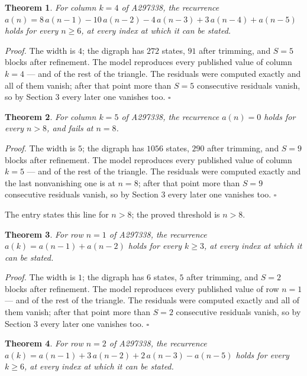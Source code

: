 \documentclass[11pt]{article}
\newtheorem{theorem}{Theorem}
\theoremstyle{definition}
\begin{document}
\begin{theorem} For column $k = 4$ of A297338, the recurrence $a(n) = 8\,a(n-1) - 10\,a(n-2) - 4\,a(n-3) + 3\,a(n-4) + a(n-5)$ holds for every $n \ge 6$, at every index at which it can be stated.\end{theorem}

{\itshape Proof.} The width is $4$; the digraph has $272$ states, $91$ after trimming, and $S = 5$ blocks after refinement. The model reproduces every published value of column $k = 4$ --- and of the rest of the triangle. The residuals were computed exactly and all of them vanish; after that point more than $S = 5$ consecutive residuals vanish, so by Section 3 every later one vanishes too. $\square$

\begin{theorem} For column $k = 5$ of A297338, the recurrence $a(n) = 0$ holds for every $n > 8$, and fails at $n = 8$.\end{theorem}

{\itshape Proof.} The width is $5$; the digraph has $1056$ states, $290$ after trimming, and $S = 9$ blocks after refinement. The model reproduces every published value of column $k = 5$ --- and of the rest of the triangle. The residuals were computed exactly and the last nonvanishing one is at $n = 8$; after that point more than $S = 9$ consecutive residuals vanish, so by Section 3 every later one vanishes too. $\square$

The entry states this line for $n > 8$; the proved threshold is $n > 8$.

\begin{theorem} For row $n = 1$ of A297338, the recurrence $a(k) = a(n-1) + a(n-2)$ holds for every $k \ge 3$, at every index at which it can be stated.\end{theorem}

{\itshape Proof.} The width is $1$; the digraph has $6$ states, $5$ after trimming, and $S = 2$ blocks after refinement. The model reproduces every published value of row $n = 1$ --- and of the rest of the triangle. The residuals were computed exactly and all of them vanish; after that point more than $S = 2$ consecutive residuals vanish, so by Section 3 every later one vanishes too. $\square$

\begin{theorem} For row $n = 2$ of A297338, the recurrence $a(k) = a(n-1) + 3\,a(n-2) + 2\,a(n-3) - a(n-5)$ holds for every $k \ge 6$, at every index at which it can be stated.\end{theorem}
\end{document}

